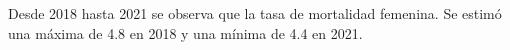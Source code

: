 Desde 2018 hasta 2021 se observa que la tasa de mortalidad femenina. Se estimó una máxima de 4.8 en 2018 y una mínima de 4.4 en 2021. 